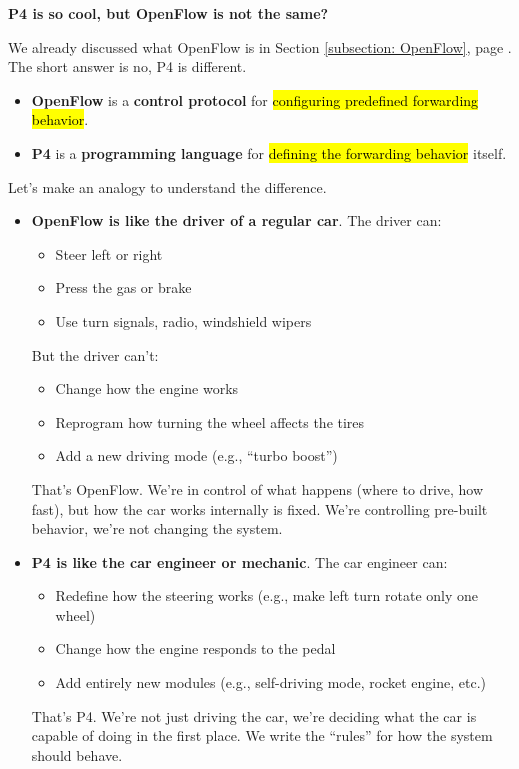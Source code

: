 \highspace
\begin{flushleft}
    \textcolor{Green3}{ \textbf{P4 is so cool, but OpenFlow is not the same?}}
\end{flushleft}
We already discussed what OpenFlow is in Section \ref{subsection: OpenFlow}, page \pageref{subsection: OpenFlow}. The short answer is no, P4 is different.
\begin{itemize}
    \item \textbf{OpenFlow} is a \textbf{control protocol} for \hl{configuring predefined forwarding behavior}.
    \item \textbf{P4} is a \textbf{programming language} for \hl{defining the forwarding behavior} itself.
\end{itemize}

\highspace
Let's make an analogy to understand the difference.
\begin{itemize}
    \item \textbf{OpenFlow is like the driver of a regular car}. The driver can:
    \begin{itemize}[label=\textcolor{Green3}{}]
        \item Steer left or right
        \item Press the gas or brake
        \item Use turn signals, radio, windshield wipers
    \end{itemize}
    But the driver can't:
    \begin{itemize}[label=\textcolor{Red2}{}]
        \item Change how the engine works
        \item Reprogram how turning the wheel affects the tires
        \item Add a new driving mode (e.g., ``turbo boost'')
    \end{itemize}
    That's OpenFlow. We're in control of what happens (where to drive, how fast), but how the car works internally is fixed. We're controlling pre-built behavior, we're not changing the system.

    \item \textbf{P4 is like the car engineer or mechanic}. The car engineer can:
    \begin{itemize}[label=\textcolor{Green3}{}]
        \item Redefine how the steering works (e.g., make left turn rotate only one wheel)
        \item Change how the engine responds to the pedal
        \item Add entirely new modules (e.g., self-driving mode, rocket engine, etc.)
    \end{itemize}
    That's P4. We're not just driving the car, we're deciding what the car is capable of doing in the first place. We write the ``rules'' for how the system should behave.
\end{itemize}

